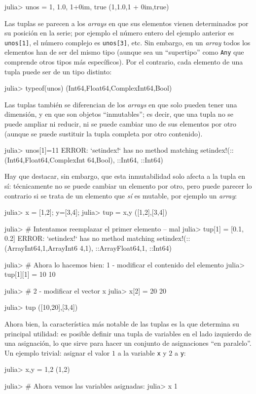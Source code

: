 ﻿\documentclass{article}
\newcommand{\jl}{\texttt}
\begin{document}
{julia> unos = 1, 1.0, 1+0im, true
(1,1.0,1 + 0im,true)

Las tuplas se parecen a los \emph{arrays} en que sus elementos vienen determinados por su posición en la serie; por ejemplo el número entero del ejemplo anterior es \jl{unos[1]}, el número complejo es \jl{unos[3]}, etc. Sin embargo, en un \emph{array} todos los elementos han de ser del mismo tipo (aunque sea un ``supertipo'' como \jl{Any} que comprende otros tipos más específicos). Por el contrario, cada elemento de una tupla puede ser de un tipo distinto: 

julia> typeof(unos)
(Int64,Float64,Complex{Int64},Bool)

Las tuplas también se diferencian de los \emph{arrays} en que solo pueden tener una dimensión, y en que son objetos ``inmutables''; es decir, que una tupla no se puede ampliar ni reducir, ni se puede cambiar uno de sus elementos por otro (aunque se puede sustituir la tupla completa por otro contenido).

julia> unos[1]=11
ERROR: `setindex!` has no method matching setindex!(::(Int64,Float64,Complex{Int
64},Bool), ::Int64, ::Int64)

Hay que destacar, sin embargo, que esta inmutabilidad solo afecta a la tupla en sí: técnicamente no se puede cambiar un elemento por otro, pero puede parecer lo contrario si se trata de un elemento que \emph{sí} es mutable, por ejemplo un \emph{array}:

julia> x = [1,2]; y=[3,4];
julia> tup = x,y
([1,2],[3,4])

julia> # Intentamos reemplazar el primer elemento -- mal
julia> tup[1] = [0.1, 0.2]
ERROR: `setindex!` has no method matching setindex!(::(Array{Int64,1},Array{Int6
4,1}), ::Array{Float64,1}, ::Int64)

julia> # Ahora lo hacemos bien: 1 - modificar el contenido del elemento
julia> tup[1][1] = 10
10

julia> # 2 - modificar el vector x
julia> x[2] = 20
20

julia> tup
([10,20],[3,4])

Ahora bien, la característica más notable de las tuplas es la que determina su principal utilidad: es posible definir una tupla de variables en el lado izquierdo de una asignación, lo que sirve para hacer un conjunto de asignaciones ``en paralelo''. Un ejemplo trivial: asignar el valor $1$ a la variable \jl{x} y $2$ a \jl{y}:

julia> x,y = 1,2
(1,2)

julia> # Ahora vemos las variables asignadas:
julia> x
1

}
\end{document}
